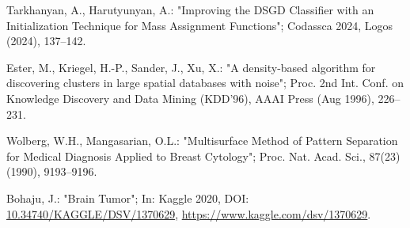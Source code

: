 \documentclass[10pt,a4paper,oneside]{article}
\begin{document}
\begin{thebibliography}{}
{
Tarkhanyan, A., Harutyunyan, A.:
"Improving the DSGD Classifier with an Initialization Technique for Mass Assignment Functions";
Codassca 2024, Logos (2024), 137–142.

Ester, M., Kriegel, H.-P., Sander, J., Xu, X.:
"A density-based algorithm for discovering clusters in large spatial databases with noise";
Proc. 2nd Int. Conf. on Knowledge Discovery and Data Mining (KDD'96), AAAI Press (Aug 1996), 226--231.

Wolberg, W.H., Mangasarian, O.L.: "Multisurface Method of Pattern Separation for Medical Diagnosis Applied to Breast Cytology";
Proc. Nat. Acad. Sci., 87(23) (1990), 9193--9196.

Bohaju, J.: "Brain Tumor";
In: Kaggle 2020, DOI: \url{10.34740/KAGGLE/DSV/1370629}, \url{https://www.kaggle.com/dsv/1370629}.

}\end{thebibliography}
\end{document}

